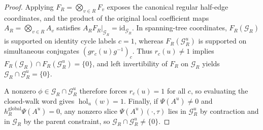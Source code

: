 \begin{proof}\leanok
    Applying $F_R=\bigotimes_{v\in R}F_v$ exposes the canonical regular
    half-edge coordinates, and the product of the original local coefficient
    maps $A_R=\bigotimes_{v\in R}A_v$ satisfies
    $A_RF_R|_{\mathcal G_R}=\mathrm{id}_{\mathcal G_R}$. In spanning-tree
    coordinates, $F_R(\mathcal G_R)$ is supported on identity cycle labels
    $c=1$, whereas $F_R(\mathcal G_R^u)$ is supported on simultaneous
    conjugates $(gr_c(u)g^{-1})_c$. Thus $r_c(u)\ne 1$ implies
    $F_R(\mathcal G_R)\cap F_R(\mathcal G_R^u)=\{0\}$, and left invertibility
    of $F_R$ on $\mathcal G_R$ yields $\mathcal G_R\cap\mathcal G_R^u=\{0\}$.

    A nonzero $\phi\in\mathcal G_R\cap\mathcal G_R^u$ therefore forces
    $r_c(u)=1$ for all $c$, so evaluating the closed-walk word gives
    $\operatorname{hol}_u(w)=1$. Finally, if $\Psi(A^u)\ne 0$ and
    $h_R^{\mathrm{global}}\Psi(A^u)=0$, any nonzero slice
    $\Psi(A^u)(\cdot,\tau)$ lies in $\mathcal G_R^u$ by contraction and in
    $\mathcal G_R$ by the parent constraint, so
    $\mathcal G_R\cap\mathcal G_R^u\ne\{0\}$.
\end{proof}
